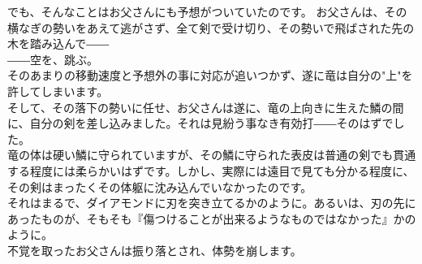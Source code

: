\documentclass[oneside, a4paper]{jsbook}
\begin{document}
でも、そんなことはお父さんにも予想がついていたのです。
お父さんは、その横なぎの勢いをあえて逃がさず、全て剣で受け切り、その勢いで飛ばされた先の木を踏み込んで――\\

――空を、跳ぶ。\\

そのあまりの移動速度と予想外の事に対応が追いつかず、遂に竜は自分の"上"を許してしまいます。\\

そして、その落下の勢いに任せ、お父さんは遂に、竜の上向きに生えた鱗の間に、自分の剣を差し込みました。それは見紛う事なき有効打――そのはずでした。\\

竜の体は硬い鱗に守られていますが、その鱗に守られた表皮は普通の剣でも貫通する程度には柔らかいはずです。しかし、実際には遠目で見ても分かる程度に、その剣はまったくその体躯に沈み込んでいなかったのです。\\

それはまるで、ダイアモンドに刃を突き立てるかのように。あるいは、刃の先にあったものが、そもそも『傷つけることが出来るようなものではなかった』かのように。\\

不覚を取ったお父さんは振り落とされ、体勢を崩します。
\end{document}
